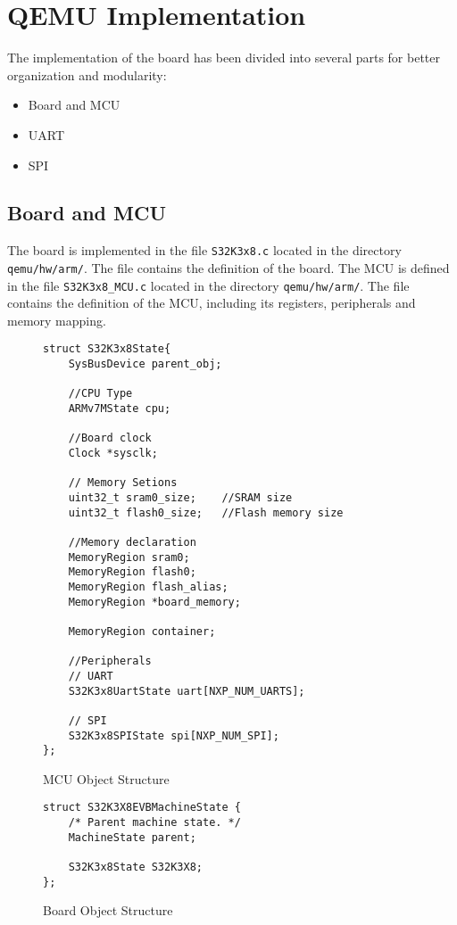 \section{QEMU Implementation}
The implementation of the board has been divided into several parts for better organization and modularity: 
\begin{itemize}
    \item Board and MCU
    \item UART
    \item SPI
\end{itemize}

\subsection{Board and MCU}
The board is implemented in the file \texttt{S32K3x8.c} located in the directory \texttt{qemu/hw/arm/}. The file contains the definition of the board. 
The MCU is defined in the file \texttt{S32K3x8\_MCU.c} located in the directory \texttt{qemu/hw/arm/}. The file contains the definition of the MCU, including its registers, peripherals and memory mapping.  
\begin{figure}
    \begin{verbatim}
struct S32K3x8State{
    SysBusDevice parent_obj;
    
    //CPU Type
    ARMv7MState cpu;
    
    //Board clock 
    Clock *sysclk;

    // Memory Setions 
    uint32_t sram0_size;    //SRAM size
    uint32_t flash0_size;   //Flash memory size
    
    //Memory declaration
    MemoryRegion sram0;
    MemoryRegion flash0;
    MemoryRegion flash_alias;
    MemoryRegion *board_memory;
    
    MemoryRegion container;
    
    //Peripherals 
    // UART
    S32K3x8UartState uart[NXP_NUM_UARTS];
    
    // SPI
    S32K3x8SPIState spi[NXP_NUM_SPI];
};
    \end{verbatim}
    \caption{MCU Object Structure}
    \label{fig:mcu_structure}
\end{figure}

\begin{figure}
    \begin{verbatim}
struct S32K3X8EVBMachineState {
    /* Parent machine state. */
    MachineState parent;
    
    S32K3x8State S32K3X8;
};
    \end{verbatim}
    \caption{Board Object Structure}
    \label{fig:board_structure}
\end{figure}

